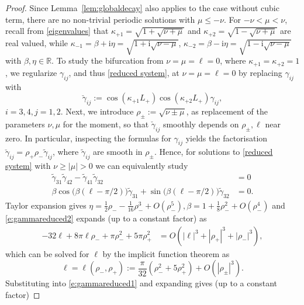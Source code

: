 \documentclass{article}
\numberwithin{equation}{section}
\def\R{\mathbb{R}}
\def\rmi{\mathrm{i}}
\begin{document}
		 \begin{proof}
		 	Since Lemma~\ref{lem:globaldecay} also applies to the case without cubic term, there are no non-trivial periodic solutions with $\mu\leq-\nu$. For $-\nu<\mu<\nu$, recall from \eqref{eigenvalues} that $\kappa_{+1} = \sqrt{1 + \sqrt{\nu+\mu}}$ and $\kappa_{+2} = \sqrt{1 - \sqrt{\nu+\mu}}$ are real valued, while $\kappa_{-1} = \beta+ \rmi\eta=\sqrt{1 + \rmi\sqrt{\nu-\mu}}$, $\kappa_{-2} = \beta-\rmi\eta=\sqrt{1 - \rmi\sqrt{\nu-\mu}}$ with $\beta,\eta\in\R$.
		 	To study the bifurcation from $\nu=\mu=\ell=0$, where $\kappa_{+1}=\kappa_{+2}=1$, we regularize $\gamma_{ij}$, and thus \eqref{reduced system}, at $\nu=\mu=\ell=0$ by replacing $\gamma_{ij}$ with 
		 	\[\check{\gamma}_{ij}:=\cos(\kappa_{+1} L_+)\cos(\kappa_{+2}L_+)\gamma_{ij},\] 
		 	$i=3,4, j=1,2$. Next, we introduce $\rho_\pm:=\sqrt{\nu \pm \mu}$, as replacement of the parameters $\nu,\mu$ for the moment, so that $\check{\gamma}_{ij}$ smoothly depends on $\rho_\pm, \ell$ near zero.  In particular, inspecting the formulas for $\gamma_{ij}$ yields the factorisation $\check{\gamma}_{ij} = \rho_+\rho_- \tilde\gamma_{ij}$, where $\tilde\gamma_{ij}$ are smooth in $\rho_\pm$. Hence, for solutions to \eqref{reduced system} with $\nu\geq|\mu|>0$ we can equivalently study 
		 	\begin{align}
		 		\tilde\gamma_{31} \tilde\gamma_{42} - \tilde\gamma_{41} \tilde\gamma_{32} &= 0 \label{e:gammareduced1} \\
		 		\beta \cos\big(\beta (\ell -\pi/2)\big) \tilde\gamma_{31} + \sin\big(\beta (\ell-\pi/2)\big) \tilde\gamma_{32} &= 0.\label{e:gammareduced2}
		 	\end{align}
		 	Taylor expansion gives 
		 	$\eta= \frac 1 2 \rho_- - \frac 1{16} \rho_-^3 + O(\rho_-^5), \beta = 1 + \frac 1 8\rho_-^2  + O(\rho_-^4)$ 
		 	and \eqref{e:gammareduced2} expands (up to a constant factor) as 
		 	\begin{align}
		 		-32  \ell +   8 \pi \ell \rho_-+ \pi \rho_-^2 + 5 \pi  \rho_+^2 &= O(|\ell|^3 + |\rho_+|^3 + |\rho_-|^3),\label{e:gamredexp2} 
		 	\end{align}
		 	which can be solved for $\ell$ by the implicit function theorem as 
		 	\[
		 	\ell = \ell(\rho_-,\rho_+) := \frac{\pi}{32}(\rho_-^2+5 \rho_+^2) + O(|\rho_\pm|^3).
		 	\]
		 	Substituting into \eqref{e:gammareduced1} and expanding gives (up to a constant factor)
		 	

\end{proof}
\end{document}

